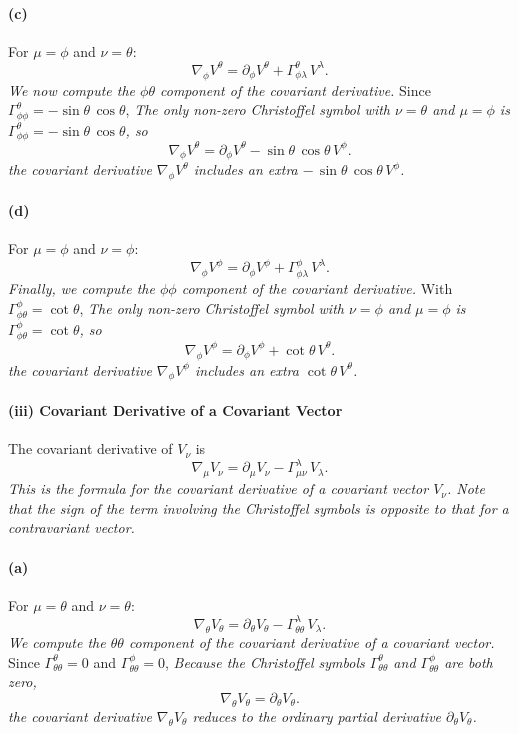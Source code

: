 \documentclass{article}
\begin{document}
\paragraph{(c)} For \(\mu = \phi\) and \(\nu = \theta\):
\[
\nabla_{\phi} V^\theta
=
\partial_\phi V^\theta
+
\Gamma^\theta_{\phi\lambda}\,V^\lambda.
\]
\emph{We now compute the \(\phi\theta\) component of the covariant derivative.}
Since \(\Gamma^\theta_{\phi\phi} = -\sin\theta\,\cos\theta\),
\emph{The only non-zero Christoffel symbol with \(\nu = \theta\) and \(\mu = \phi\) is \(\Gamma^\theta_{\phi\phi} = -\sin\theta\,\cos\theta\), so}
\[
\nabla_{\phi} V^\theta
=
\partial_\phi V^\theta
-
\sin\theta\,\cos\theta \, V^\phi.
\]
\emph{the covariant derivative \(\nabla_{\phi} V^\theta\) includes an extra \(-\,\sin\theta\,\cos\theta \, V^\phi\).}

\paragraph{(d)} For \(\mu = \phi\) and \(\nu = \phi\):
\[
\nabla_{\phi} V^\phi
=
\partial_\phi V^\phi
+
\Gamma^\phi_{\phi\lambda}\,V^\lambda.
\]
\emph{Finally, we compute the \(\phi\phi\) component of the covariant derivative.}
With \(\Gamma^\phi_{\phi\theta} = \cot\theta\),
\emph{The only non-zero Christoffel symbol with \(\nu = \phi\) and \(\mu = \phi\) is \(\Gamma^\phi_{\phi\theta} = \cot\theta\), so}
\[
\nabla_{\phi} V^\phi
=
\partial_\phi V^\phi
+
\cot\theta \, V^\theta.
\]
\emph{the covariant derivative \(\nabla_{\phi} V^\phi\) includes an extra \(\cot\theta \, V^\theta\).}

\paragraph*{(iii) Covariant Derivative of a Covariant Vector}
The covariant derivative of \(V_\nu\) is
\[
\nabla_\mu V_\nu
=
\partial_\mu V_\nu
-
\Gamma^\lambda_{\mu\nu}\,V_\lambda.
\]
\emph{This is the formula for the covariant derivative of a covariant vector \(V_\nu\). Note that the sign of the term involving the Christoffel symbols is opposite to that for a contravariant vector.}

\paragraph{(a)} For \(\mu = \theta\) and \(\nu = \theta\):
\[
\nabla_{\theta} V_\theta
=
\partial_\theta V_\theta
-
\Gamma^\lambda_{\theta\theta}\,V_\lambda.
\]
\emph{We compute the \(\theta\theta\) component of the covariant derivative of a covariant vector.}
Since \(\Gamma^\theta_{\theta\theta} = 0\) and \(\Gamma^\phi_{\theta\theta} = 0\),
\emph{Because the Christoffel symbols \(\Gamma^\theta_{\theta\theta}\) and \(\Gamma^\phi_{\theta\theta}\) are both zero,}
\[
\nabla_{\theta} V_\theta
=
\partial_\theta V_\theta.
\]
\emph{the covariant derivative \(\nabla_{\theta} V_\theta\) reduces to the ordinary partial derivative \(\partial_\theta V_\theta\).}
\end{document}
